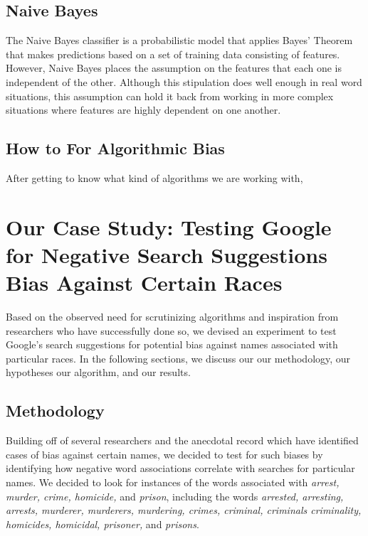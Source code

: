 \documentclass[sigconf]{acmart}
\begin{document}
\subsection{Naive Bayes}

The Naive Bayes classifier is a probabilistic model that applies Bayes' Theorem that makes predictions based on a set of training data consisting of features. However, Naive Bayes places the assumption on the features that each one is independent of the other. Although this stipulation does well enough in real word situations, this assumption can hold it back from working in more complex situations where features are highly dependent on one another.

\subsection{How to  For Algorithmic Bias}

After getting to know what kind of algorithms we are working with, 

\section{Our Case Study: Testing Google for Negative Search Suggestions Bias Against Certain Races}

Based on the observed need for scrutinizing algorithms and inspiration from researchers who have successfully done so, we devised an experiment to test Google's search suggestions for potential bias against names associated with particular races. In the following sections, we discuss our our methodology, our hypotheses our algorithm, and our results.

\subsection{Methodology}

Building off of several researchers and the anecdotal record which have identified cases of bias against certain names, we decided to test for such biases by identifying how negative word associations correlate with searches for particular names. We decided to look for instances of the words associated with {\em arrest, murder, crime, homicide,} and {\em prison}, including the words {\em arrested, arresting, arrests, murderer, murderers, murdering, crimes, criminal, criminals criminality, homicides, homicidal, prisoner,} and {\em prisons}. 
\end{document}
